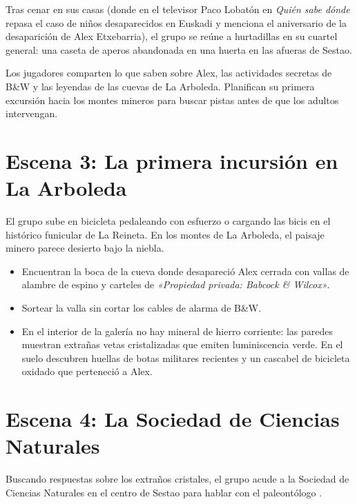 Tras cenar en sus casas (donde en el televisor Paco Lobatón en \emph{Quién sabe dónde} repasa el caso de niños desaparecidos en Euskadi y menciona el aniversario de la desaparición de Alex Etxebarria), el grupo se reúne a hurtadillas en su cuartel general: una caseta de aperos abandonada en una huerta en las afueras de Sestao.

Los jugadores comparten lo que saben sobre Alex, las actividades secretas de B\&W y las leyendas de las cuevas de La Arboleda. Planifican su primera excursión hacia los montes mineros para buscar pistas antes de que los adultos intervengan.

\section{Escena 3: La primera incursión en La Arboleda}

El grupo sube en bicicleta pedaleando con esfuerzo o cargando las bicis en el histórico funicular de La Reineta. En los montes de La Arboleda, el paisaje minero parece desierto bajo la niebla.

\begin{itemize}
  \item {} Encuentran la boca de la cueva donde desapareció Alex cerrada con vallas de alambre de espino y carteles de \emph{«Propiedad privada: Babcock \& Wilcox»}.
  \item {} Sortear la valla sin cortar los cables de alarma de B\&W.
  \item {} En el interior de la galería no hay mineral de hierro corriente: las paredes muestran extrañas vetas cristalizadas que emiten luminiscencia verde. En el suelo descubren huellas de botas militares recientes y un cascabel de bicicleta oxidado que perteneció a Alex.
\end{itemize}

\section{Escena 4: La Sociedad de Ciencias Naturales}


Buscando respuestas sobre los extraños cristales, el grupo acude a la Sociedad de Ciencias Naturales en el centro de Sestao para hablar con el paleontólogo .

